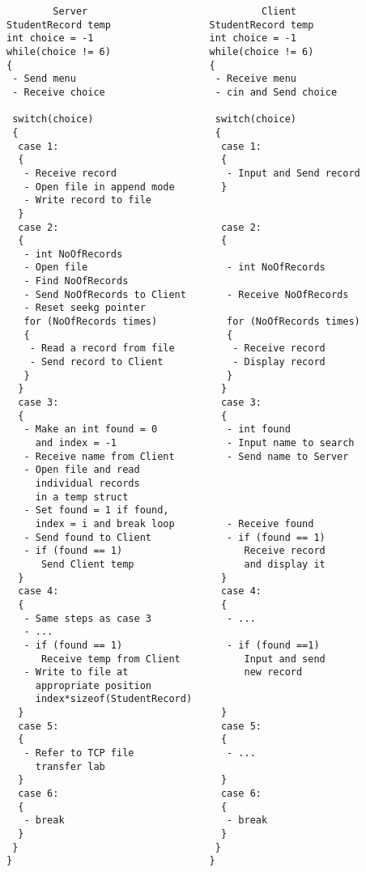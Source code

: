 \documentclass[12pt,a4paper]{article}
\begin{document}
\begin{lstlisting}
        Server                              Client
StudentRecord temp                 StudentRecord temp
int choice = -1                    int choice = -1
while(choice != 6)                 while(choice != 6)
{                                  {
 - Send menu                        - Receive menu
 - Receive choice                   - cin and Send choice
    
 switch(choice)                     switch(choice)
 {                                  {
  case 1:                            case 1:
  {                                  {
   - Receive record                   - Input and Send record
   - Open file in append mode        }
   - Write record to file
  }
  case 2:                            case 2:
  {                                  {
   - int NoOfRecords 
   - Open file                        - int NoOfRecords
   - Find NoOfRecords
   - Send NoOfRecords to Client       - Receive NoOfRecords
   - Reset seekg pointer
   for (NoOfRecords times)            for (NoOfRecords times)
   {                                  {
    - Read a record from file          - Receive record
    - Send record to Client            - Display record
   }                                  }
  }                                  }
  case 3:                            case 3:
  {                                  {
   - Make an int found = 0            - int found
     and index = -1                   - Input name to search
   - Receive name from Client         - Send name to Server
   - Open file and read             
     individual records
     in a temp struct
   - Set found = 1 if found,
     index = i and break loop         - Receive found
   - Send found to Client             - if (found == 1)
   - if (found == 1)                     Receive record
      Send Client temp                   and display it
  }                                  }
  case 4:                            case 4:
  {                                  {
   - Same steps as case 3             - ...
   - ...
   - if (found == 1)                  - if (found ==1)
      Receive temp from Client           Input and send
   - Write to file at                    new record
     appropriate position            
     index*sizeof(StudentRecord)
  }                                  }
  case 5:                            case 5:
  {                                  { 
   - Refer to TCP file                - ...
     transfer lab
  }                                  }
  case 6:                            case 6:
  {                                  {
   - break                            - break
  }                                  }
 }                                  }
}                                  }
\end{lstlisting}
\end{document}
